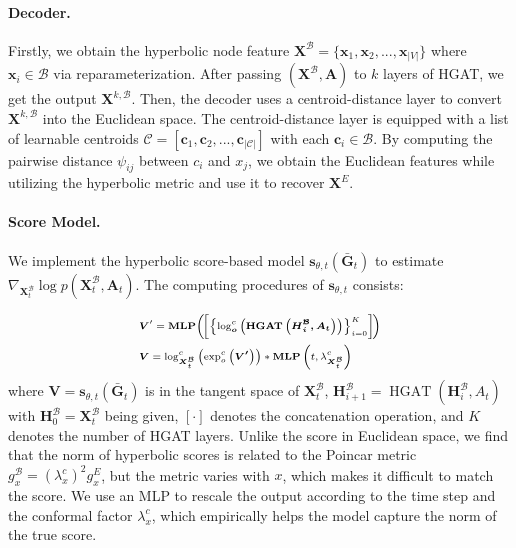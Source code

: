 \documentclass[letterpaper]{article} %
\begin{document}
\paragraph{Decoder.}
Firstly, we obtain the hyperbolic node feature $\boldsymbol{X}^{\mathcal{B}}=\{\boldsymbol{x}_1,\boldsymbol{x}_2,...,\boldsymbol{x}_{|V|}\}$ where $\boldsymbol{x}_{i}\in \mathcal{B}$ via reparameterization.
After passing $(\boldsymbol{X}^{\mathcal{B}},\boldsymbol{A})$ to $k$ layers of HGAT, we get the output $\boldsymbol{X}^{k,\mathcal{B}}$. Then, the decoder uses a centroid-distance layer \cite{liu2019hyperbolic} to convert $\boldsymbol{X}^{k,\mathcal{B}}$ into the Euclidean space.
The centroid-distance layer is equipped with a list of learnable centroids $\mathcal{C}=[\boldsymbol{c}_1,\boldsymbol{c}_2,...,\boldsymbol{c}_{|\mathcal{C}|}]$ with each $\boldsymbol{c}_{i}\in \mathcal{B}$.
By computing the pairwise distance $\psi_{ij}$ between $c_i$ and $x_j$, we obtain the Euclidean features while utilizing the hyperbolic metric and use it to recover $\boldsymbol{X}^{E}$.

\paragraph{Score Model.}
We implement the hyperbolic score-based model $\boldsymbol{s}_{\theta, t}(\boldsymbol{\bar{G}}_{t})$ to estimate $\nabla_{\boldsymbol{X}^\mathcal{B}_{t}} \log p\left(\boldsymbol{X}^\mathcal{B}_{t},\boldsymbol{A}_{t} \right)$. The computing procedures of $\boldsymbol{s}_{\theta, t}$ consists:

\begin{equation}
\begin{scriptsize}{
\begin{aligned}
&\boldsymbol{V}^\prime=\operatorname{\textbf{MLP}}\!\left(\!\left[\left\{\log _{\boldsymbol{o}}^{c}\left(\boldsymbol{\operatorname{HGAT}\left(\boldsymbol{H}^\mathcal{B}_{i}, \boldsymbol{A}_{t}\right)}\right)\right\}_{i=0}^{K}\right]\!\right) \\
&\boldsymbol{V} = \log^c_{\boldsymbol{X}^\mathcal{B}_{t}} \left(\exp^c_o
\left( \boldsymbol{V^\prime}\right) \right) * \operatorname{\textbf{MLP}}\left(t,\lambda^c_{\boldsymbol{X}^\mathcal{B}_t}\right)
\end{aligned}
}\end{scriptsize}
\end{equation}
where $\boldsymbol{V}=\boldsymbol{s}_{\theta, t}(\boldsymbol{\bar{G}}_{t}) $ is in the tangent space of $\boldsymbol{X}^\mathcal{B}_{t}$, $\boldsymbol{H}^\mathcal{B}_{i+1} = \operatorname{HGAT}(\boldsymbol{H}^\mathcal{B}_i, A_t)$ with $\boldsymbol{H}^\mathcal{B}_0 = \boldsymbol{X}^\mathcal{B}_t$ being given, $[\cdot]$ denotes the concatenation operation, and $K$ denotes the number of HGAT layers.
Unlike the score in Euclidean space, we find that the norm of hyperbolic scores is related to the Poincar metric $g^\mathcal{B}_x=(\lambda^c_x)^2g^E_x$,
but the metric varies with $x$, which makes it difficult to match the score. We use an MLP to rescale the output according to the time step and the conformal factor $\lambda^c_x$, which empirically helps the model capture the norm of the true score.
\end{document}
